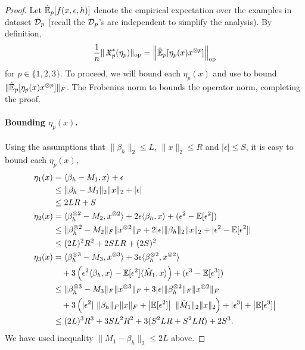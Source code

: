 \begin{proof}
Let $\hat{\operatorname{\mathbb{E}}}_p[f(x,\epsilon,h)]$ denote the empirical expectation over
the examples in dataset $\mathcal{D}_p$ (recall the $\mathcal{D}_p$'s are independent to
simplify the analysis).  By definition,
$$\frac1n \|\operatorname{\mathfrak{X}}_p^*(\eta_p)\|_{\text{\rm op}} = \left\| \hat{\operatorname{\mathbb{E}}}_p[\eta_p(x) x^{\otimes p}] \right\|_{\text{\rm op}} $$
for $p \in \{1,2,3\}$. To proceed, we will bound each $\eta_p(x)$
\iftoggle{withappendix}{}{
, defined in \refeqn{eta1}, \refeqn{eta2} and \refeqn{eta3},} and use  to bound $\|
\hat{\operatorname{\mathbb{E}}}_p[\eta_p(x) x^{\otimes p}] \|_F$. The Frobenius norm to bounds the
operator norm, completing the proof.


\paragraph{Bounding $\eta_p(x)$.}
Using the assumptions that $\|\beta_h\|_2 \le L$, $\|x\|_2 \le R$ and
$|\epsilon| \le S$, it is easy to bound each $\eta_p(x)$,
\begin{align*}
  \eta_1(x) &= \langle \beta_h - M_1, x \rangle + \epsilon \\
            &\le \|\beta_h - M_1\|_2 \|x\|_2 + |\epsilon| \\
            &\le 2LR + S \\
  \eta_2(x) 
    &= \langle \beta_h^{\otimes 2} - M_2, x^{\otimes 2} \rangle + 2 \epsilon \langle \beta_h, x \rangle + (\epsilon^2 - \operatorname{\mathbb{E}}[\epsilon^2]) \\
    &\le \|\beta_h^{\otimes 2} - M_2\|_F \|x^{\otimes 2}\|_F + 2 |\epsilon| \|\beta_h\|_2\|x\|_2 + |\epsilon^2 - \operatorname{\mathbb{E}}[\epsilon^2]| \\
    &\le (2L)^2 R^2 + 2 S L R + (2S)^2 \\
  \eta_3(x) &= \langle \beta_h^{\otimes 3} - M_3, x^{\otimes 3} \rangle
        + 3 \epsilon \langle \beta_h^{\otimes 2}, x^{\otimes 2} \rangle \\
        &\quad + 3\left(\epsilon^2 \langle \beta_h, x \rangle - \operatorname{\mathbb{E}}[\epsilon^2] \langle \hat M_1, x \rangle\right)
        + (\epsilon^3 - \operatorname{\mathbb{E}}[\epsilon^3]) \\
  &\le \|\beta_h^{\otimes 3} - M_3\|_F\|x^{\otimes 3}\|_F
        + 3 |\epsilon| \|\beta_h^{\otimes 2}\|_F \|x^{\otimes 2}\|_F  \\
        &\quad + 3 \left( |\epsilon^2|~\|\beta_h\|_F\|x\|_F + \left|\operatorname{\mathbb{E}}[\epsilon^2]\right|~\|\hat M_1\|_2\|x\|_2 \right)
        + |\epsilon^3| + \left| \operatorname{\mathbb{E}}[\epsilon^3] \right| \\
  &\le (2L)^3 R^3 + 3 S L^2 R^2 + 3 ( S^2 L R + S^2 L R ) + 2S^3.
\end{align*}
We have used inequality $\|M_1 - \beta_h\|_2 \le 2L$ above. 


\end{proof}
